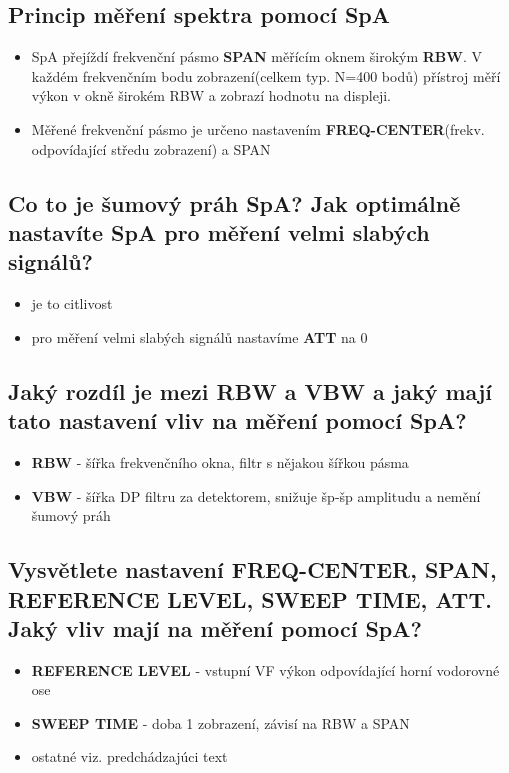 \documentclass[a4paper]{article}
\begin{document}
\subsection{\textbf{Princip měření spektra pomocí SpA}}
\begin{itemize}
	\item SpA přejíždí frekvenční pásmo \textbf{SPAN} měřícím oknem širokým \textbf{RBW}. V každém frekvenčním bodu zobrazení(celkem typ. N=400 bodů) přístroj měří výkon v okně širokém RBW a zobrazí hodnotu na displeji.
	\item Měřené frekvenční pásmo je určeno nastavením \textbf{FREQ-CENTER}(frekv. odpovídající středu zobrazení) a SPAN 
\end{itemize}
\subsection{\textbf{Co to je šumový práh SpA? Jak optimálně nastavíte SpA pro měření velmi slabých signálů?}}
\begin{itemize}
	\item je to citlivost
	\item pro měření velmi slabých signálů nastavíme \textbf{ATT} na 0
\end{itemize}
\subsection{\textbf{Jaký rozdíl je mezi RBW a VBW a jaký mají tato nastavení vliv na měření pomocí SpA?}}
\begin{itemize}
	\item \textbf{RBW} - šířka frekvenčního okna, filtr s nějakou šířkou pásma
	\item \textbf{VBW} - šířka DP filtru za detektorem, snižuje šp-šp amplitudu a nemění šumový práh
\end{itemize}
\subsection{\textbf{Vysvětlete nastavení FREQ-CENTER, SPAN, REFERENCE LEVEL, SWEEP TIME, ATT. Jaký vliv mají na měření pomocí SpA?}}
\begin{itemize}
	\item \textbf{REFERENCE LEVEL} - vstupní VF výkon odpovídající horní vodorovné ose
	\item \textbf{SWEEP TIME} - doba 1 zobrazení, závisí na RBW a SPAN
	\item ostatné viz. predchádzajúci text
\end{itemize}
\end{document}
